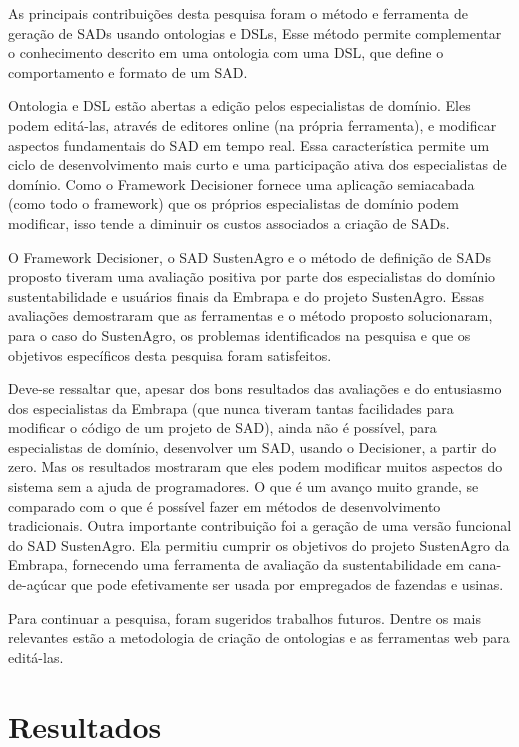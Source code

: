 As principais contribuições desta pesquisa foram o método e ferramenta
de geração de SADs usando ontologias e \foreignlanguage{english}{DSLs},
Esse método permite complementar o conhecimento descrito em uma ontologia
com uma DSL, que define o comportamento e formato de um SAD. 

Ontologia e DSL estão abertas a edição pelos especialistas de domínio.
Eles podem editá-las, através de editores online (na própria ferramenta),
e modificar aspectos fundamentais do SAD em tempo real. Essa característica
permite um ciclo de desenvolvimento mais curto e uma participação
ativa dos especialistas de domínio. Como o Framework Decisioner fornece
uma aplicação semiacabada (como todo o framework) que os próprios
especialistas de domínio podem modificar, isso tende a diminuir os
custos associados a criação de SADs. 

O Framework Decisioner, o SAD SustenAgro e o método de definição de
SADs proposto tiveram uma avaliação positiva por parte dos especialistas
do domínio sustentabilidade e usuários finais da Embrapa e do projeto
SustenAgro. Essas avaliações demostraram que as ferramentas e o método
proposto solucionaram, para o caso do SustenAgro, os problemas identificados
na pesquisa e que os objetivos específicos desta pesquisa foram satisfeitos.

Deve-se ressaltar que, apesar dos bons resultados das avaliações e
do entusiasmo dos especialistas da Embrapa (que nunca tiveram tantas
facilidades para modificar o código de um projeto de SAD), ainda não
é possível, para especialistas de domínio, desenvolver um SAD, usando
o Decisioner, a partir do zero. Mas os resultados mostraram que eles
podem modificar muitos aspectos do sistema sem a ajuda de programadores.
O que é um avanço muito grande, se comparado com o que é possível
fazer em métodos de desenvolvimento tradicionais. Outra importante
contribuição foi a geração de uma versão funcional do SAD SustenAgro.
Ela permitiu cumprir os objetivos do projeto SustenAgro da Embrapa,
fornecendo uma ferramenta de avaliação da sustentabilidade em cana-de-açúcar
que pode efetivamente ser usada por empregados de fazendas e usinas.

Para continuar a pesquisa, foram sugeridos trabalhos futuros. Dentre
os mais relevantes estão a metodologia de criação de ontologias e
as ferramentas web para editá-las.

\section{Resultados}

